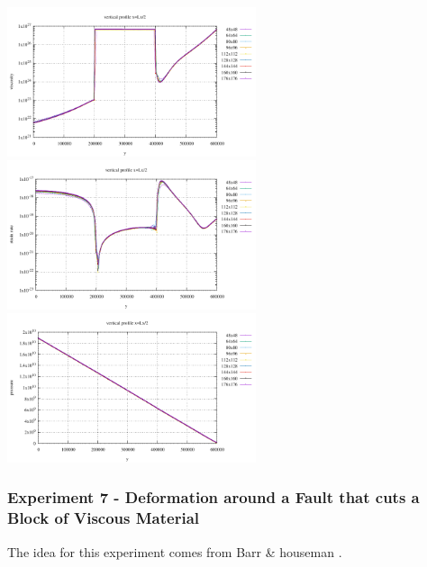 \begin{center}
\includegraphics[width=7.3cm]{python_codes/fieldstone_87/results/experiment_06/vertical_profile_eta}\\
\includegraphics[width=7.3cm]{python_codes/fieldstone_87/results/experiment_06/vertical_profile_sr}
\includegraphics[width=7.3cm]{python_codes/fieldstone_87/results/experiment_06/vertical_profile_p}\\
\end{center}



\newpage
\subsubsection*{Experiment 7 - Deformation around a Fault that cuts a Block of Viscous Material}

The idea for this experiment comes from Barr \& houseman \cite{baho92,baho96}.


